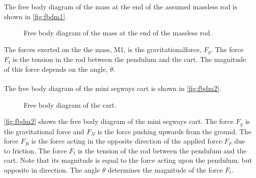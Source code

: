 The free body diagram of the mass at the end of the assumed massless rod is shown in \autoref{fig:fbdm1}.
\begin{figure}[H]
\centering
\scalebox{0.9}{}
\caption{Free body diagram of the mass at the end of the massless rod.}
\label{fig:fbdm1}
\end{figure}
The forces exerted on the the mass, M1, is the gravitationalforce, $F_g$. The force $F_t$ is the tension in the rod between the pendulum and the cart. The magnitude of this force depends on the angle, $\theta$.\\\\
The free body diagram of the mini segways cart is shown in \autoref{fig:fbdm2}.
\begin{figure}[H]
\centering
\scalebox{1.3}{}
\caption{Free body diagram of the cart.}
\label{fig:fbdm2}
\end{figure}
\autoref{fig:fbdm2} shows the free body diagram of the mini segways cart. The force $F_g$ is the gravitational force and $F_N$ is the force pushing upwards from the ground. The force $F_B$ is the force acting in the opposite direction of the applied force $F_F$ due to friction. The force $F_t$ is the tension of the rod between the pendulum and the cart. Note that its magnitude is equal to the force acting upon the pendulum, but opposite in direction. The angle $\theta$ determines the magnitude of the force $F_t$.



